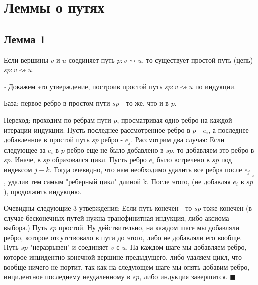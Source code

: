 \documentclass{article}
\begin{document}
\section {Леммы о путях}

\subsection {Лемма 1}

Если вершины \(v\) и \(u\) соединяет путь \(p: v \rightsquigarrow u\), то существует простой путь (цепь) \(sp: v \rightsquigarrow u\).\newline

\(\square\)
Докажем это утверждение, построив простой путь \(sp: v \rightsquigarrow u\) по индукции.\newline

База: первое ребро в простом пути \(sp\) - то же, что и в \(p\).\newline

Переход: проходим по ребрам пути \(p\), просматривая одно ребро на каждой итерации индукции. Пусть последнее рассмотренное ребро в \(p\) - \(e_i\), а последнее добавленное в простой путь \(sp\) ребро - \(e_j\).\newline
Рассмотрим два случая:\newline
\tab\tab Если следующее за \(e_i\) в \(p\) ребро еще не было добавлено в \(sp\), то добавляем это ребро в \(sp\).\newline
\tab\tab Иначе, в \(sp\) образовался цикл. Пусть ребро \(e_i\) было встречено в \(sp\) под индексом \(j-k\). Тогда очевидно, что нам необходимо удалить все ребра после \(e_j_-_k\), удалив тем самым "реберный цикл" длиной k. После этого, (не добавляя \(e_i\) в \(sp\)), продолжить индукцию.\newline

Очевидны следующие 3 утверждения:\newline
\tab\tab Если путь конечен - то \(sp\) тоже конечен (в случае бесконечных путей нужна трансфинитная индукция, либо аксиома выбора.)\newline
\tab\tab Путь \(sp\) простой. Ну действительно, на каждом шаге мы добавляли ребро, которое отсутствовало в пути до этого, либо не добавляли его вообще.
\tab\tab Путь \(sp\) "неразрывен" и соединяет \(v\) с \(u\). На каждом шаге мы добавляем ребро, которое инцидентно конечной вершине предыдущего, либо удаляем цикл, что вообще ничего не портит, так как на следующем шаге мы опять добавим ребро, инцидентное последнему неудаленному в \(sp\), либо индукция завершится.
\(\blacksquare\)
\newline\newline\newline
\end{document}
